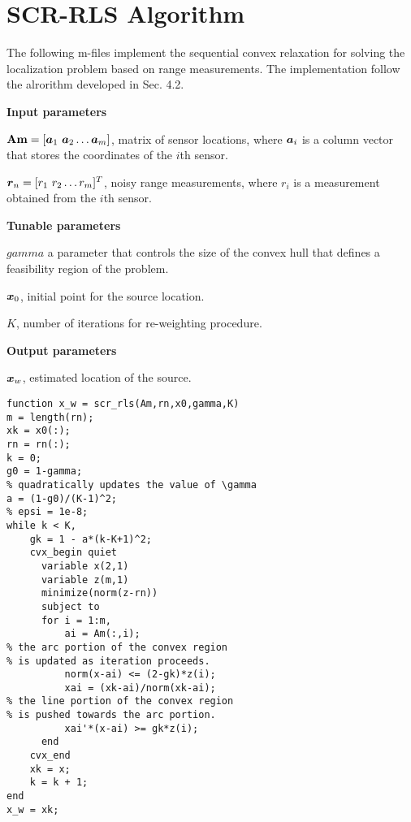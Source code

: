 \section{SCR-RLS Algorithm}

The following m-files implement the sequential convex relaxation for solving the localization problem based on range measurements. The implementation follow the alrorithm developed in Sec. 4.2.

\phantom{m}

\noindent
\textbf{Input parameters}

\noindent
$\mbox{\textbf{Am}} = [\mbox{\boldmath$a$}_1 \ \mbox{\boldmath$a$}_2 \ldots \mbox{\boldmath$a$}_m]$, matrix of sensor locations, where $\mbox{\boldmath$a$}_i$ is a column vector that stores the coordinates of the $i$th sensor.

\noindent
$\mbox{\boldmath$r$}_n = [r_1 \ r_2 \ldots r_m]^T$, noisy range measurements, where $r_i$ is a measurement obtained from the $i$th sensor.

\noindent
\textbf{Tunable parameters}

\noindent
$gamma$ a parameter that controls the size of the convex hull that defines a feasibility region of the problem.

\noindent
$\mbox{\boldmath$x$}_0$, initial point for the source location.

\noindent
$K$, number of iterations for re-weighting procedure.

\noindent
\textbf{Output parameters}

\noindent
$\mbox{\boldmath$x$}_w$, estimated location of the source.

\phantom{m}

\begin{lstlisting}
function x_w = scr_rls(Am,rn,x0,gamma,K)
m = length(rn);
xk = x0(:);
rn = rn(:);
k = 0;
g0 = 1-gamma;
% quadratically updates the value of \gamma
a = (1-g0)/(K-1)^2;        
% epsi = 1e-8;
while k < K,
    gk = 1 - a*(k-K+1)^2;   
    cvx_begin quiet
      variable x(2,1)
      variable z(m,1)
      minimize(norm(z-rn))
      subject to
      for i = 1:m,
          ai = Am(:,i);
% the arc portion of the convex region 
% is updated as iteration proceeds.
          norm(x-ai) <= (2-gk)*z(i);  
          xai = (xk-ai)/norm(xk-ai);
% the line portion of the convex region 
% is pushed towards the arc portion.
          xai'*(x-ai) >= gk*z(i);     
      end
    cvx_end
    xk = x;
    k = k + 1;
end
x_w = xk;
\end{lstlisting}